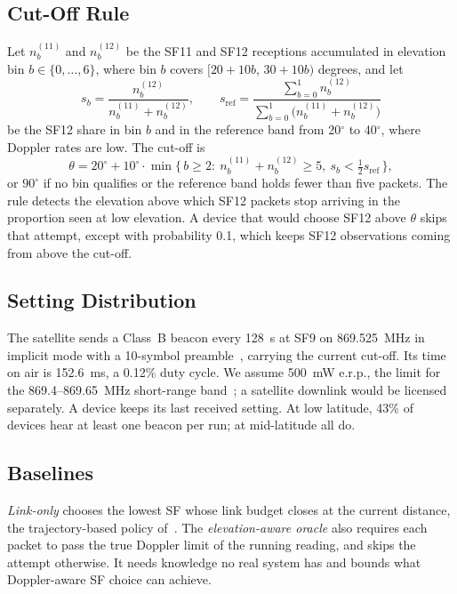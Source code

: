 \documentclass[journal]{IEEEtran}
\begin{document}
\subsection{Cut-Off Rule}
Let $n^{(11)}_b$ and $n^{(12)}_b$ be the SF11 and SF12 receptions accumulated in elevation bin $b\in\{0,\dots,6\}$, where bin $b$ covers $[20+10b,\,30+10b)$ degrees, and let
\begin{equation}
s_b=\frac{n^{(12)}_b}{n^{(11)}_b+n^{(12)}_b},\qquad
s_{\mathrm{ref}}=\frac{\sum_{b=0}^{1}n^{(12)}_b}{\sum_{b=0}^{1}\bigl(n^{(11)}_b+n^{(12)}_b\bigr)}
\end{equation}
be the SF12 share in bin $b$ and in the reference band from 20$^\circ$ to 40$^\circ$, where Doppler rates are low. The cut-off is
\begin{equation}\label{eq:cutoff}
\theta=20^\circ+10^\circ\cdot\min\{\,b\ge2:\ n^{(11)}_b+n^{(12)}_b\ge5,\ s_b<\tfrac12 s_{\mathrm{ref}}\,\},
\end{equation}
or $90^\circ$ if no bin qualifies or the reference band holds fewer than five packets. The rule detects the elevation above which SF12 packets stop arriving in the proportion seen at low elevation. A device that would choose SF12 above $\theta$ skips that attempt, except with probability 0.1, which keeps SF12 observations coming from above the cut-off.

\subsection{Setting Distribution}
The satellite sends a Class~B beacon every 128~s at SF9 on 869.525~MHz in implicit mode with a 10-symbol preamble~\cite{lorawanL2,lorawanRP}, carrying the current cut-off. Its time on air is 152.6~ms, a 0.12\% duty cycle. We assume 500~mW e.r.p., the limit for the 869.4--869.65~MHz short-range band~\cite{erc7003}; a satellite downlink would be licensed separately. A device keeps its last received setting. At low latitude, 43\% of devices hear at least one beacon per run; at mid-latitude all do.

\subsection{Baselines}
\emph{Link-only} chooses the lowest SF whose link budget closes at the current distance, the trajectory-based policy of~\cite{alvarez2022}. The \emph{elevation-aware oracle} also requires each packet to pass the true Doppler limit of the running reading, and skips the attempt otherwise. It needs knowledge no real system has and bounds what Doppler-aware SF choice can achieve.
\end{document}
